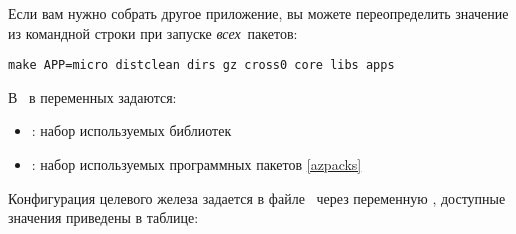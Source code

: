 
Если вам нужно собрать другое приложение, вы можете переопределить значение из
командной строки при запуске \emph{всех}\ пакетов:

\begin{verbatim}
make APP=micro distclean dirs gz cross0 core libs apps
\end{verbatim}

В \ в переменных задаются:

\begin{itemize}
  \item {}: набор используемых библиотек
  \item {}: набор используемых программных пакетов \ref{azpacks}
\end{itemize}



\secup

\label{azhw}

Конфигурация целевого железа задается в файле \ через
переменную , доступные значения приведены в таблице:

